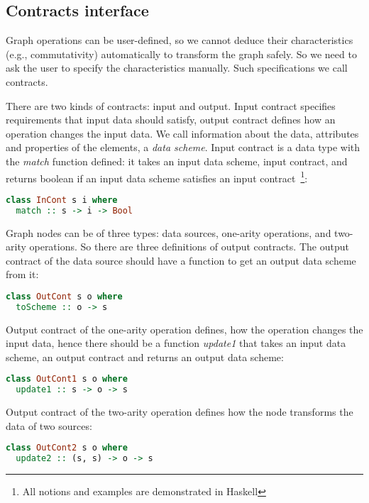 \subsection{Contracts interface}

Graph operations can be user-defined, so we cannot deduce their characteristics (e.g., commutativity) automatically to transform the graph safely.
So we need to ask the user to specify the characteristics manually.
Such specifications we call contracts.

There are two kinds of contracts: input and output.
Input contract specifies requirements that input data should satisfy, output contract defines how an operation changes the input data.
We call information about the data, attributes and properties of the elements, a {\em data scheme}.
Input contract is a data type with the {\em match} function defined: it takes an input data scheme, input contract, and returns boolean if an input data scheme satisfies an input contract~\footnote{All notions and examples are demonstrated in Haskell}:

\begin{lstlisting}[language=Haskell]
class InCont s i where
  match :: s -> i -> Bool
\end{lstlisting}

Graph nodes can be of three types: data sources, one-arity operations, and two-arity operations.
So there are three definitions of output contracts.
The output contract of the data source should have a function to get an output data scheme from it:

\begin{lstlisting}[language=Haskell]
class OutCont s o where
  toScheme :: o -> s
\end{lstlisting}

Output contract of the one-arity operation defines, how the operation changes the input data, hence there should be a function {\em update1} that takes an input data scheme, an output contract and returns an output data scheme:

\begin{lstlisting}[language=Haskell]
class OutCont1 s o where
  update1 :: s -> o -> s
\end{lstlisting}

Output contract of the two-arity operation defines how the node transforms the data of two sources:

\begin{lstlisting}[language=Haskell]
class OutCont2 s o where
  update2 :: (s, s) -> o -> s
\end{lstlisting}

